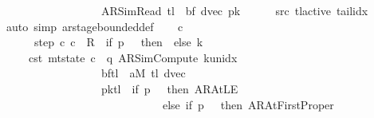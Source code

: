 \begin{isabellebody}
\ \ \ \ \ \ \ \ \ \ \ \ \ \ \ \ \ \ {\isacharparenleft}{\kern0pt}AR{\isacharunderscore}{\kern0pt}SimRead{\isacharcomma}{\kern0pt}\ {\isacharquery}{\kern0pt}tl{\isacharcomma}{\kern0pt}\ {}{\isacharcomma}{\kern0pt}\ {\isacharquery}{\kern0pt}bf{\isacharcomma}{\kern0pt}\ dvec{\isacharcomma}{\kern0pt}\ {\isacharquery}{\kern0pt}pk{\isacharparenright}{\kern0pt}{\isachardoublequoteclose}\isanewline
\ \ \ \ \isamarkupfalse%
\ src{}\ tl{\isacharunderscore}{\kern0pt}active\ tail{\isacharunderscore}{\kern0pt}idx\ \isamarkupfalse%
\ {\isacharparenleft}{\kern0pt}auto\ simp{\isacharcolon}{\kern0pt}\ ar{\isacharunderscore}{\kern0pt}stage{\isacharunderscore}{\kern0pt}bounded{\isacharunderscore}{\kern0pt}def{\isacharparenright}{\kern0pt}\isanewline
\ \ \isamarkupfalse%
\ c{}\ \isanewline
\ \ \ \ \ \ step{\isacharcolon}{\kern0pt}\ {\isachardoublequoteopen}{\isacharparenleft}{\kern0pt}c{}{\isacharcomma}{\kern0pt}\ c{}{\isacharparenright}{\kern0pt}\ {\isasymin}\ R{\isacharprime}{\kern0pt}\ {\isacharcircum}{\kern0pt}{\isacharcircum}{\kern0pt}\ {\isacharparenleft}{\kern0pt}if\ {\isacharquery}{\kern0pt}p\ {\isacharequal}{\kern0pt}\ {}\ then\ {}\ else\ {\isacharquery}{\kern0pt}k\ {\isacharplus}{\kern0pt}\ {}{\isacharparenright}{\kern0pt}{\isachardoublequoteclose}\isanewline
\ \ \ \ \ c{}{\isacharunderscore}{\kern0pt}st{\isacharcolon}{\kern0pt}\ {\isachardoublequoteopen}mt{\isacharunderscore}{\kern0pt}state\ c{}\ {\isacharequal}{\kern0pt}\ {\isacharparenleft}{\kern0pt}q{\isacharcomma}{\kern0pt}\ AR{\isacharunderscore}{\kern0pt}SimCompute{\isacharcomma}{\kern0pt}\ k{\isacharunderscore}{\kern0pt}unidx\ {}{\isacharcomma}{\kern0pt}\ {}{\isacharcomma}{\kern0pt}\isanewline
\ \ \ \ \ \ \ \ \ \ \ \ \ \ \ \ \ \ {\isacharquery}{\kern0pt}bf{\isacharparenleft}{\kern0pt}{\isacharquery}{\kern0pt}tl\ {\isacharcolon}{\kern0pt}{\isacharequal}{\kern0pt}\ {\isacharquery}{\kern0pt}aM\ {\isacharquery}{\kern0pt}tl{\isacharparenright}{\kern0pt}{\isacharcomma}{\kern0pt}\ dvec{\isacharcomma}{\kern0pt}\isanewline
\ \ \ \ \ \ \ \ \ \ \ \ \ \ \ \ \ \ {\isacharquery}{\kern0pt}pk{\isacharparenleft}{\kern0pt}{\isacharquery}{\kern0pt}tl\ {\isacharcolon}{\kern0pt}{\isacharequal}{\kern0pt}\ if\ {\isacharquery}{\kern0pt}p\ {\isacharequal}{\kern0pt}\ {}\ then\ AR{\isacharunderscore}{\kern0pt}AtLE\isanewline
\ \ \ \ \ \ \ \ \ \ \ \ \ \ \ \ \ \ \ \ \ \ \ \ \ \ \ \ \ else\ if\ {\isacharquery}{\kern0pt}p\ {\isacharequal}{\kern0pt}\ {}\ then\ AR{\isacharunderscore}{\kern0pt}AtFirstProper\isanewline

\end{isabellebody}
